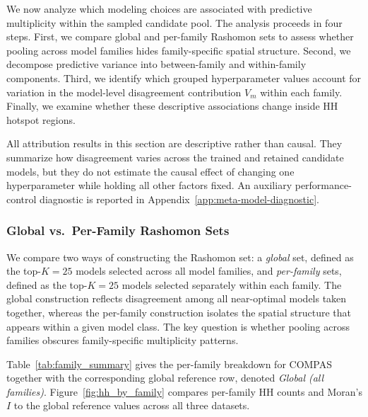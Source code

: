 We now analyze which modeling choices are associated with predictive multiplicity within
the sampled candidate pool. The analysis proceeds in four steps. First, we compare
global and per-family Rashomon sets to assess whether pooling across model families
hides family-specific spatial structure. Second, we decompose predictive variance into
between-family and within-family components. Third, we identify which grouped
hyperparameter values account for variation in the model-level disagreement contribution
$V_m$ within each family. Finally, we examine whether these descriptive associations
change inside HH hotspot regions.

All attribution results in this section are descriptive rather than causal. They summarize
how disagreement varies across the trained and retained candidate models, but they do not
estimate the causal effect of changing one hyperparameter while holding all other factors
fixed. An auxiliary performance-control diagnostic is reported in
Appendix~\ref{app:meta-model-diagnostic}.

\subsubsection{Global vs.\ Per-Family Rashomon Sets}
\label{sec:results-global-vs-family}

We compare two ways of constructing the Rashomon set: a \emph{global} set, defined as
the top-$K=25$ models selected across all model families, and \emph{per-family} sets,
defined as the top-$K=25$ models selected separately within each family. The global
construction reflects disagreement among all near-optimal models taken together, whereas
the per-family construction isolates the spatial structure that appears within a given model
class. The key question is whether pooling across families obscures family-specific
multiplicity patterns.

Table~\ref{tab:family_summary} gives the per-family breakdown for COMPAS together
with the corresponding global reference row, denoted \emph{Global (all families)}.
Figure~\ref{fig:hh_by_family} compares per-family HH counts and Moran's $I$ to the
global reference values across all three datasets.

\begin{table}[htbp]
\centering
\caption{Per-family Rashomon sets and global reference on COMPAS. Per-family rows use
the top-$K=25$ models within each family. The \emph{Global (all families)} row uses the
top-$K=25$ models selected from the full candidate pool across all families. Values are
mean $\pm$ standard deviation over runs. HH rate reports the share of held-out test observations
classified as HH.}
\label{tab:family_summary}
\vspace{0.5em}

\end{table}

